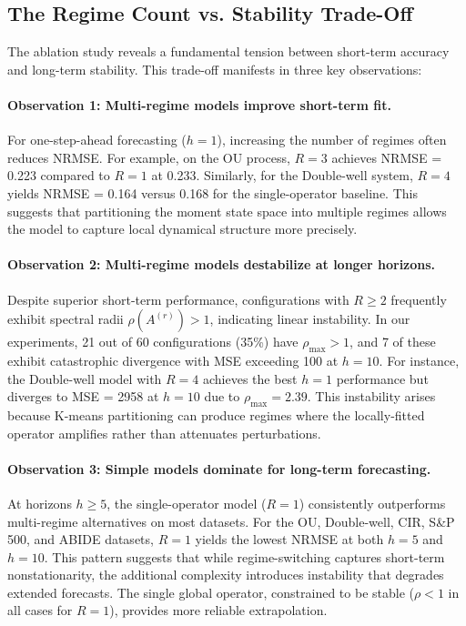 \documentclass[journal, onecolumn]{IEEEtran}
\begin{document}


\subsection{The Regime Count vs. Stability Trade-Off}

The ablation study reveals a fundamental tension between short-term accuracy and long-term stability. This trade-off manifests in three key observations:

\paragraph{Observation 1: Multi-regime models improve short-term fit.}
For one-step-ahead forecasting ($h=1$), increasing the number of regimes often reduces NRMSE. For example, on the OU process, $R=3$ achieves NRMSE = 0.223 compared to $R=1$ at 0.233. Similarly, for the Double-well system, $R=4$ yields NRMSE = 0.164 versus 0.168 for the single-operator baseline. This suggests that partitioning the moment state space into multiple regimes allows the model to capture local dynamical structure more precisely.

\paragraph{Observation 2: Multi-regime models destabilize at longer horizons.}
Despite superior short-term performance, configurations with $R \ge 2$ frequently exhibit spectral radii $\rho(A^{(r)}) > 1$, indicating linear instability. In our experiments, 21 out of 60 configurations (35\%) have $\rho_{\max} > 1$, and 7 of these exhibit catastrophic divergence with MSE exceeding 100 at $h=10$. For instance, the Double-well model with $R=4$ achieves the best $h=1$ performance but diverges to MSE = 2958 at $h=10$ due to $\rho_{\max} = 2.39$. This instability arises because K-means partitioning can produce regimes where the locally-fitted operator amplifies rather than attenuates perturbations.

\paragraph{Observation 3: Simple models dominate for long-term forecasting.}
At horizons $h \ge 5$, the single-operator model ($R=1$) consistently outperforms multi-regime alternatives on most datasets. For the OU, Double-well, CIR, S\&P 500, and ABIDE datasets, $R=1$ yields the lowest NRMSE at both $h=5$ and $h=10$. This pattern suggests that while regime-switching captures short-term nonstationarity, the additional complexity introduces instability that degrades extended forecasts. The single global operator, constrained to be stable ($\rho < 1$ in all cases for $R=1$), provides more reliable extrapolation.
\end{document}
